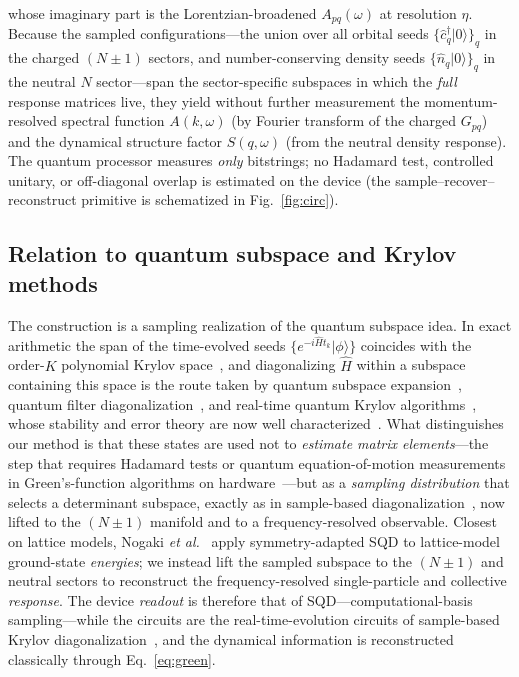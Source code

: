 whose imaginary part is the Lorentzian-broadened $A_{pq}(\omega)$ at resolution $\eta$. Because the sampled
configurations---the union over all orbital seeds $\{\hat c^\dagger_q\lvert 0\rangle\}_q$ in the charged
$(N{\pm}1)$ sectors, and number-conserving density seeds $\{\hat n_q\lvert 0\rangle\}_q$ in the neutral
$N$ sector---span the sector-specific subspaces in which the \emph{full} response matrices live, they
yield without further measurement the momentum-resolved spectral function $A(k,\omega)$ (by Fourier
transform of the charged $G_{pq}$) and the dynamical structure factor $S(q,\omega)$ (from the neutral
density response). The quantum processor measures \emph{only} bitstrings; no Hadamard test, controlled
unitary, or off-diagonal overlap is estimated on the device (the sample--recover--reconstruct primitive
is schematized in Fig.~\ref{fig:circ}).

\subsection{Relation to quantum subspace and Krylov methods}
The construction is a sampling realization of the quantum subspace idea. In exact arithmetic the span
of the time-evolved seeds $\{e^{-i\hat H t_k}\lvert\phi\rangle\}$ coincides with the order-$K$
polynomial Krylov space~\cite{shen2023,kirby2023}, and diagonalizing $\hat H$ within a subspace
containing this space is the route taken by quantum subspace expansion~\cite{mcclean2017qse}, quantum
filter diagonalization~\cite{parrish2019}, and real-time quantum Krylov
algorithms~\cite{cortesgray2022}, whose stability and error theory are now
well characterized~\cite{epperly2022}. What distinguishes our method is that these
states are used not to \emph{estimate matrix elements}---the step that requires Hadamard tests or
quantum equation-of-motion measurements in Green's-function algorithms on
hardware~\cite{bauer2016,endo2020,rungger2020,greenediniz2024,bespalova2025}---but as a \emph{sampling
distribution} that selects a determinant subspace, exactly as in sample-based
diagonalization~\cite{robledomoreno2025,kanno2023,skqd2025}, now lifted to the $(N{\pm}1)$ manifold
and to a frequency-resolved observable. Closest on lattice models, Nogaki \emph{et al.}~\cite{nogaki2025}
apply symmetry-adapted SQD to lattice-model ground-state \emph{energies}; we instead lift the sampled
subspace to the $(N{\pm}1)$ and neutral sectors to reconstruct the frequency-resolved single-particle and
collective \emph{response}. The device \emph{readout} is therefore that of SQD---computational-basis
sampling---while the circuits are the real-time-evolution circuits of sample-based Krylov
diagonalization~\cite{skqd2025,yoshioka2025}, and the dynamical information is reconstructed
classically through Eq.~\eqref{eq:green}.

